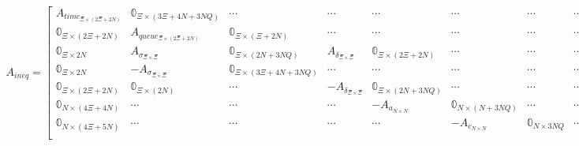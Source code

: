 \documentclass[conference]{IEEEtran}
\begin{document}
\begin{equation}
\begin{array}{c}
    A_{ineq} =
    \begin{bmatrix}
        A_{time_{\Xi \times (2\Xi + 2N)}}   & \mathbb{0}_{\Xi \times (3\Xi + 4N + 3NQ)} & \cdots                                    & \cdots                       & \cdots                              & \cdots                          & \cdots                    & \cdots                & \cdots                    \\
        \mathbb{0}_{\Xi \times (2\Xi + 2N)} & A_{queue_{\Xi \times (2\Xi + 2N)}}        & \mathbb{0}_{\Xi \times (\Xi + 2N)}        & \cdots                       & \cdots                              & \cdots                          & \cdots                    & \cdots                & \cdots                    \\
        \mathbb{0}_{\Xi \times 2N}          & A_{\sigma_{\Xi \times \Xi}}               & \mathbb{0}_{\Xi \times (2N + 3NQ)}        & A_{\delta_{\Xi \times \Xi}}  & \mathbb{0}_{\Xi \times (2\Xi + 2N)} & \cdots                          & \cdots                    & \cdots                & \cdots                    \\
        \mathbb{0}_{\Xi \times 2N}          & -A_{\sigma_{\Xi \times \Xi}}              & \mathbb{0}_{\Xi \times (3\Xi + 4N + 3NQ)} & \cdots                       & \cdots                              & \cdots                          & \cdots                    & \cdots                & \cdots                    \\
        \mathbb{0}_{\Xi \times (2\Xi + 2N)} & \mathbb{0}_{\Xi \times (2N)}              & \cdots                                    & -A_{\delta_{\Xi \times \Xi}} & \mathbb{0}_{\Xi \times (2N + 3NQ)}  & \cdots                          & \cdots                    & \cdots                & \cdots                    \\
        \mathbb{0}_{N \times (4\Xi + 4N)}   & \cdots                                    & \cdots                                    & \cdots                       & -A_{a_{N \times N}}                 & \mathbb{0}_{N \times (N + 3NQ)} & \cdots                    & \cdots                & \cdots                    \\
        \mathbb{0}_{N \times (4\Xi + 5N)}   & \cdots                                    & \cdots                                    & \cdots                       & \cdots                              & -A_{c_{N \times N}}             & \mathbb{0}_{N \times 3NQ} & \cdots                & \cdots                    \\

\end{bmatrix}
\end{array}
\end{equation}
\end{document}
